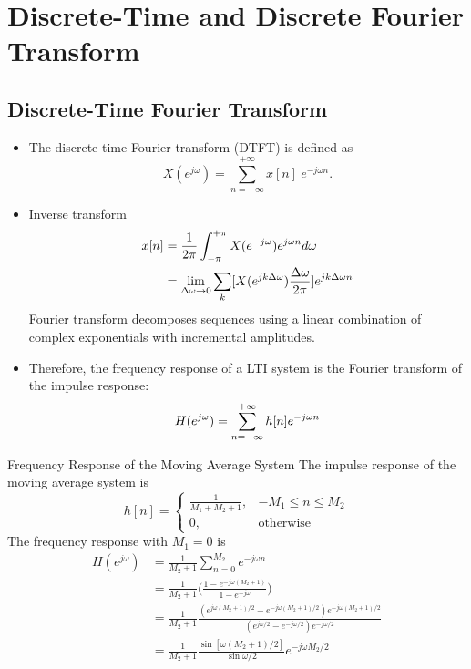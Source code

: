 \section{Discrete-Time and Discrete Fourier Transform}
\subsection{Discrete-Time Fourier Transform}
\begin{itemize}
    \item The discrete-time Fourier transform (DTFT) is defined as
    \begin{equation} \label{eqn:dtft}
        X(e^{j\omega}) = \sum_{n=-\infty}^{+\infty} x[n] \ e^{-j\omega n}.
    \end{equation}

    \item Inverse transform
    \begin{align}
        x[n]
        &= \frac{1}{2\pi} \int_{-\pi}^{+\pi} X(e^{-j\omega}) e^{j\omega n} d\omega \\
        &= \lim_{\Delta \omega \to 0} \sum_{k} [X(e^{jk\Delta \omega})\frac{\Delta \omega}{2\pi}]e^{jk\Delta \omega n}
    \end{align}
    Fourier transform decomposes sequences using a linear combination of complex exponentials with incremental amplitudes.

    \item Therefore, the frequency response of a LTI system is the Fourier transform of the impulse response:
    \begin{equation}
        H(e^{j\omega}) = \sum_{n=-\infty}^{+\infty} h[n] e^{-j\omega n}
    \end{equation}
\end{itemize}

\begin{ex}{Frequency Response of the Moving Average System}
The impulse response of the moving average system is
\[
    h[n] = 
    \begin{cases}
        \frac{1}{M_1+M_2+1},    & -M_1 \leq n \leq M_2 \\
        0,  & \text{otherwise}
    \end{cases} 
\]
The frequency response with $M_1=0$ is
\begin{align*}
    H(e^{j\omega}) 
    & = \frac{1}{M_2+1} \sum_{n=0}^{M_2}e^{-j\omega n} \\
    & = \frac{1}{M_2+1} \bigg( \frac{1-e^{-j\omega (M_{2}+1)}}{1-e^{-j\omega}} \bigg) \\
    & = \frac{1}{M_2+1} \frac{(e^{j\omega(M_{2}+1)/2} - e^{-j\omega(M_{2}+1)/2})e^{-j\omega(M_{2}+1)/2}}{(e^{j\omega/2}-e^{-j\omega/2})e^{-j\omega/2}} \\
    & = \frac{1}{M_2+1} \frac{\sin[\omega(M_{2}+1)/2]}{\sin \omega/2}e^{-j\omega M_{2}/2}
\end{align*}
\end{ex}

